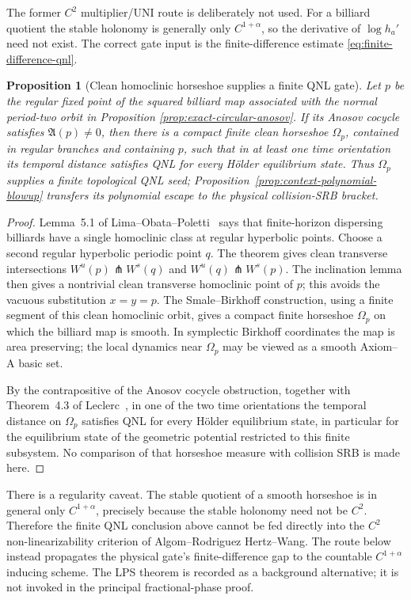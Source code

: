 \documentclass[11pt]{article}
\newtheorem{proposition}[theorem]{Proposition}
\begin{document}
The former $C^2$ multiplier/UNI route is deliberately not used.  For a
billiard quotient the stable holonomy is generally only $C^{1+\alpha}$, so
the derivative of $\log h_a'$ need not exist.  The correct gate input is the
finite-difference estimate \eqref{eq:finite-difference-qnl}.

\begin{proposition}[Clean homoclinic horseshoe supplies a finite QNL gate]
\label{prop:homoclinic-horseshoe-uni}
Let $p$ be the regular fixed point of the squared billiard map associated with
the normal period-two orbit in Proposition
\ref{prop:exact-circular-anosov}.  If its Anosov cocycle satisfies
$\mathfrak A(p)\ne0$, then there is a compact finite clean horseshoe
$\Omega_p$, contained in regular branches and containing $p$, such that in at
least one time orientation its temporal distance satisfies QNL for every
H\"older equilibrium state.  Thus $\Omega_p$ supplies a finite topological
      QNL seed; Proposition~\ref{prop:context-polynomial-blowup} transfers its
      polynomial escape to the physical collision-SRB bracket.
\end{proposition}

\begin{proof}
Lemma~5.1 of Lima--Obata--Poletti~\cite{LOP} says that finite-horizon
dispersing billiards have a single homoclinic class at regular hyperbolic
points.  Choose a second regular hyperbolic periodic point $q$.  The theorem
gives clean transverse intersections
$W^u(p)\pitchfork W^s(q)$ and $W^u(q)\pitchfork W^s(p)$.  The inclination
lemma then gives a nontrivial clean transverse homoclinic point of $p$; this
avoids the vacuous substitution $x=y=p$.  The Smale--Birkhoff construction, using
a finite segment of this clean homoclinic orbit, gives a compact finite
horseshoe $\Omega_p$ on which the billiard map is smooth.  In symplectic
Birkhoff coordinates the map is area preserving; the local dynamics near
$\Omega_p$ may be viewed as a smooth Axiom--A basic set.

By the contrapositive of the Anosov cocycle obstruction, together with
Theorem~4.3 of Leclerc~\cite{Leclerc2026}, in one of the two time orientations
the temporal distance on $\Omega_p$ satisfies QNL for every H\"older
equilibrium state, in particular for the equilibrium state of the geometric
potential restricted to this finite subsystem.  No comparison of that
horseshoe measure with collision SRB is made here.
\end{proof}

There is a regularity caveat.  The stable quotient of a smooth horseshoe is in
general only $C^{1+\alpha}$, precisely because the stable holonomy need not be
$C^2$.  Therefore the finite QNL conclusion above cannot be fed directly
into the $C^2$ non-linearizability criterion of
Algom--Rodriguez Hertz--Wang.  The route below instead propagates the
physical gate's finite-difference gap to the countable
$C^{1+\alpha}$ inducing scheme.  The LPS theorem is recorded as a background
alternative; it is not invoked in the principal fractional-phase proof.
\end{document}
